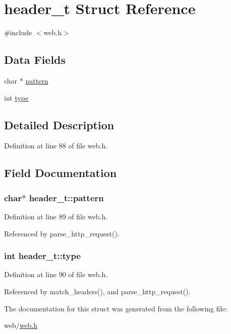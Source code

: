 \hypertarget{structheader__t}{\section{header\-\_\-t Struct Reference}
\label{structheader__t}
}


{\ttfamily \#include $<$web.\-h$>$}

\subsection*{Data Fields}
\begin{DoxyCompactItemize}
\item 
char $\ast$ \hyperlink{structheader__t_a389d7564d1b1fd7b7ace82e15525e18c}{pattern}
\item 
int \hyperlink{structheader__t_a1f179d0a706f9ec29e1ac8ef9e67b8af}{type}
\end{DoxyCompactItemize}


\subsection{Detailed Description}


Definition at line 88 of file web.\-h.



\subsection{Field Documentation}
\hypertarget{structheader__t_a389d7564d1b1fd7b7ace82e15525e18c}{
\subsubsection[{pattern}]{\setlength{\rightskip}{0pt plus 5cm}char$\ast$ header\-\_\-t\-::pattern}}\label{structheader__t_a389d7564d1b1fd7b7ace82e15525e18c}


Definition at line 89 of file web.\-h.



Referenced by parse\-\_\-http\-\_\-request().

\hypertarget{structheader__t_a1f179d0a706f9ec29e1ac8ef9e67b8af}{
\subsubsection[{type}]{\setlength{\rightskip}{0pt plus 5cm}int header\-\_\-t\-::type}}\label{structheader__t_a1f179d0a706f9ec29e1ac8ef9e67b8af}


Definition at line 90 of file web.\-h.



Referenced by match\-\_\-headers(), and parse\-\_\-http\-\_\-request().



The documentation for this struct was generated from the following file\-:\begin{DoxyCompactItemize}
\item 
web/\hyperlink{web_8h}{web.\-h}\end{DoxyCompactItemize}
